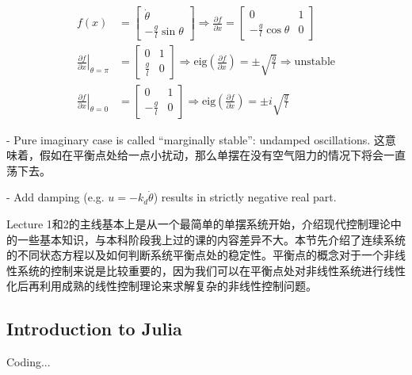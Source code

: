 \begin{align*}
    f(x)                                                       & =\begin{bmatrix}
        \dot{\theta } \\
        -\frac{g}{l}\sin \theta
    \end{bmatrix} \Rightarrow
    \frac{\partial f}{\partial x} =
    \begin{bmatrix}
        0                       & 1 \\
        -\frac{g}{l}\cos \theta & 0
    \end{bmatrix}                                                                                                                                                                                    \\
    \left.\frac{\partial f}{\partial x}\right| _{\theta =\pi } & =\begin{bmatrix}
        0           & 1 \\
        \frac{g}{l} & 0
    \end{bmatrix} \Rightarrow \text{eig}\left(\frac{\partial f}{\partial x}\right) =\pm \sqrt{\frac{g}{l}} \Rightarrow \text{unstable} \\
    \left. \frac{\partial f}{\partial x}\right| _{\theta =0}   & =\begin{bmatrix}
        0            & 1 \\
        -\frac{g}{l} & 0
    \end{bmatrix} \Rightarrow \text{eig}\left(\frac{\partial f}{\partial x}\right) =\pm i\sqrt{\frac{g}{l}}
\end{align*}

- Pure imaginary case is called ``marginally stable'': undamped oscillations. 这意味着，假如在平衡点处给一点小扰动，那么单摆在没有空气阻力的情况下将会一直荡下去。

- Add damping (e.g. $u=-k_d\dot\theta$) results in strictly negative real part.

Lecture 1和2的主线基本上是从一个最简单的单摆系统开始，介绍现代控制理论中的一些基本知识，与本科阶段我上过的课的内容差异不大。本节先介绍了连续系统的不同状态方程以及如何判断系统平衡点处的稳定性。平衡点的概念对于一个非线性系统的控制来说是比较重要的，因为我们可以在平衡点处对非线性系统进行线性化后再利用成熟的线性控制理论来求解复杂的非线性控制问题。

\subsection{Introduction to Julia}

Coding...